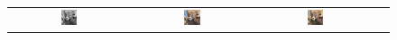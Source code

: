 \documentclass[10pt,twocolumn,letterpaper]{article}
\def\acollumsize{0.14\textwidth}
\begin{document}
\begin{figure}[t!]
\begin{center}
\small
\setlength{\tabcolsep}{2pt}
\begin{tabular}{ cccc }
\includegraphics[width=\acollumsize]{img/result/1_in.JPEG}&
\includegraphics[width=\acollumsize]{img/result/1.png}&
\includegraphics[width=\acollumsize]{img/result/1_gt.JPEG}& \\


\end{tabular}
\end{center}
\end{figure}
\end{document}
